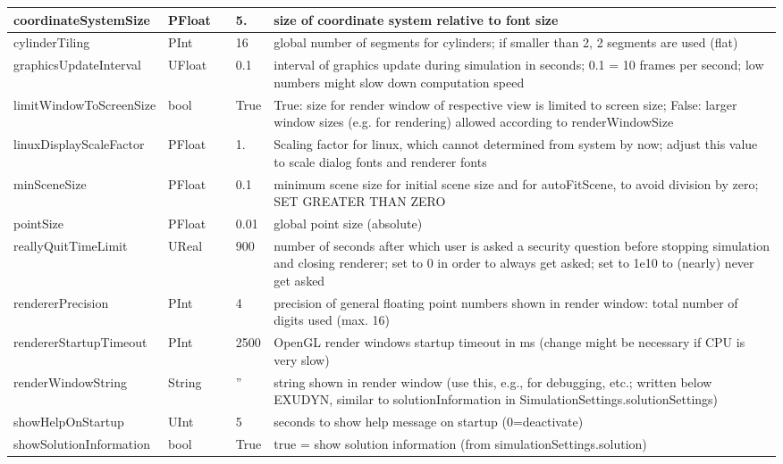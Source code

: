 \begin{center}
\begin{longtable}{| p{4.2cm} | p{2.5cm} | p{0.3cm} | p{3.0cm} | p{6cm} |}
    coordinateSystemSize &     PFloat &      &     5. &     size of coordinate system relative to font size\\ \hline
    cylinderTiling &     PInt &      &     16 &     global number of segments for cylinders; if smaller than 2, 2 segments are used (flat)\\ \hline
    graphicsUpdateInterval &     UFloat &      &     0.1 &     interval of graphics update during simulation in seconds; 0.1 = 10 frames per second; low numbers might slow down computation speed\\ \hline
    limitWindowToScreenSize &     bool &      &     True &     True: size for render window of respective view is limited to screen size; False: larger window sizes (e.g. for rendering) allowed according to renderWindowSize\\ \hline
    linuxDisplayScaleFactor &     PFloat &      &     1. &     Scaling factor for linux, which cannot determined from system by now; adjust this value to scale dialog fonts and renderer fonts\\ \hline
    minSceneSize &     PFloat &      &     0.1 &     minimum scene size for initial scene size and for autoFitScene, to avoid division by zero; SET GREATER THAN ZERO\\ \hline
    pointSize &     PFloat &      &     0.01 &     global point size (absolute)\\ \hline
    reallyQuitTimeLimit &     UReal &      &     900 &     number of seconds after which user is asked a security question before stopping simulation and closing renderer; set to 0 in order to always get asked; set to 1e10 to (nearly) never get asked\\ \hline
    rendererPrecision &     PInt &      &     4 &     precision of general floating point numbers shown in render window: total number of digits used  (max. 16)\\ \hline
    rendererStartupTimeout &     PInt &      &     2500 &     OpenGL render windows startup timeout in ms (change might be necessary if CPU is very slow)\\ \hline
    renderWindowString &     String &      &     '' &     string shown in render window (use this, e.g., for debugging, etc.; written below EXUDYN, similar to solutionInformation in SimulationSettings.solutionSettings)\\ \hline
    showHelpOnStartup &     UInt &      &     5 &     seconds to show help message on startup (0=deactivate)\\ \hline
    showSolutionInformation &     bool &      &     True &     true = show solution information (from simulationSettings.solution)\\ \hline

\end{longtable}
\end{center}

